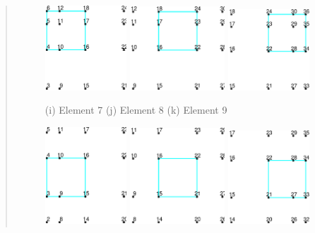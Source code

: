 \begin{quote}
\begin{figure}[!b]
\begin{center}

\centerline{
\includegraphics[width=1.2in]{figs/mesh_3_e7} \hspace{0.2in}
\includegraphics[width=1.4in]{figs/mesh_3_e8} \hspace{0.2in}
\includegraphics[width=1.2in]{figs/mesh_3_e9}
}

\centerline{(i) Element 7 \hspace{0.7in} (j) Element 8 \hspace{0.7in} (k) Element 9}

\centerline{
\includegraphics[width=1.2in]{figs/mesh_3_e4} \hspace{0.2in}
\includegraphics[width=1.4in]{figs/mesh_3_e5} \hspace{0.2in}
\includegraphics[width=1.2in]{figs/mesh_3_e6}
}


\end{center}
\end{figure}
\end{quote}
